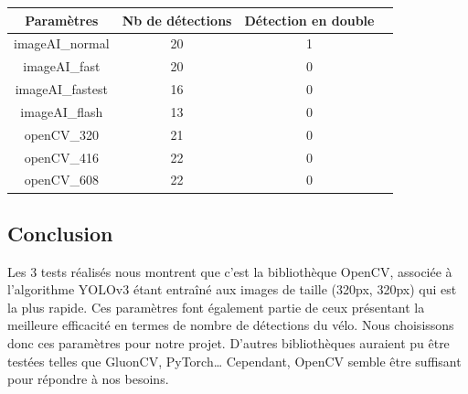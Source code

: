 \begin{center}
    \begin{tabular}{|c|c|c|c|}
        \hline
        \rowcolor{tableColorDark} Paramètres & Nb de détections & Détection en double \\
        \hline 

        imageAI\_normal                      &        20        &         1           \\\hline
        imageAI\_fast                        &        20        &         0           \\\hline
        imageAI\_fastest                     &        16        &         0           \\\hline
        imageAI\_flash                       &        13        &         0           \\\hline
        openCV\_320                          &        21        &         0           \\\hline
        openCV\_416                          &        22        &         0           \\\hline
        openCV\_608                          &        22        &         0           \\\hline
    \end{tabular}
    \label{tab_3fps}
\end{center}

\subsection{Conclusion}
\label{sec:comparaisonIA:conclusion}

Les 3 tests réalisés nous montrent que c'est la bibliothèque OpenCV, 
associée à l'algorithme YOLOv3 étant entraîné aux images de taille (320px, 320px) qui est la plus rapide.
Ces paramètres font également partie de ceux présentant la meilleure efficacité en termes de nombre de détections du vélo.
Nous choisissons donc ces paramètres pour notre projet.
D'autres bibliothèques auraient pu être testées telles que GluonCV, PyTorch\dots
Cependant, OpenCV semble être suffisant pour répondre à nos besoins.